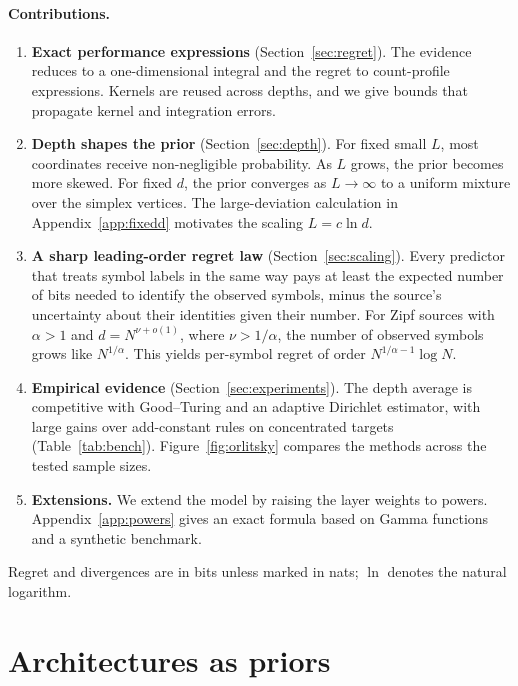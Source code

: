 \documentclass[anon]{alt2027}
\begin{document}
\paragraph{Contributions.}
\begin{enumerate}[leftmargin=*,itemsep=1pt,topsep=2pt]
\item \textbf{Exact performance expressions} (Section~\ref{sec:regret}). The evidence reduces to a one-dimensional integral and the regret to count-profile expressions. Kernels are reused across depths, and we give bounds that propagate kernel and integration errors.
\item \textbf{Depth shapes the prior} (Section~\ref{sec:depth}). 
For fixed small $L$, most coordinates receive non-negligible probability. 
As $L$ grows, the prior becomes more skewed. 
For fixed $d$, the prior converges as $L\to\infty$ to a uniform mixture over the simplex vertices.
The large-deviation calculation in Appendix~\ref{app:fixedd} motivates the scaling $L=c\ln d$. 
\item \textbf{A sharp leading-order regret law} (Section~\ref{sec:scaling}). Every predictor that treats symbol labels in the same way pays at least the expected number of bits needed to identify the observed symbols, minus the source's uncertainty about their identities given their number. For Zipf sources with $\alpha>1$ and $d=N^{\nu+o(1)}$, where $\nu>1/\alpha$, the number of observed symbols grows like $N^{1/\alpha}$.
This yields per-symbol regret of order $N^{1/\alpha-1}\log N$.
\item \textbf{Empirical evidence} (Section~\ref{sec:experiments}). The depth average is competitive with Good--Turing and an adaptive Dirichlet estimator, with large gains over add-constant rules on concentrated targets (Table~\ref{tab:bench}). Figure~\ref{fig:orlitsky} compares the methods across the tested sample sizes.
\item \textbf{Extensions.} 
We extend the model by raising the layer weights to powers. Appendix~\ref{app:powers} gives an exact formula based on Gamma functions and a synthetic benchmark.
\end{enumerate}
Regret and divergences are in bits unless marked in nats; $\ln$ denotes the natural logarithm.

\section{Architectures as priors}
\label{sec:setting}
\end{document}
